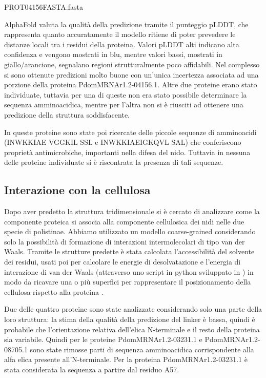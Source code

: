 \begin{texshade}{PROT04156FASTA.fasta}
  \shadeallresidues                    %
  \showlegend                          %
\end{texshade}


AlphaFold valuta la qualità della predizione tramite il punteggio pLDDT, che rappresenta quanto accuratamente il modello ritiene di poter prevedere le distanze locali tra i residui della proteina. 
Valori pLDDT alti indicano alta confidenza e vengono mostrati in blu, mentre valori bassi, mostrati in giallo/arancione, segnalano regioni strutturalmente poco affidabili.
Nel complesso si sono ottenute predizioni molto buone con un'unica incertezza associata ad una porzione della proteina PdomMRNAr1.2-04156.1.
Altre due proteine erano stato individuate, tuttavia per una di queste non era stato possibile determinare la sequenza amminoacidica, mentre per l'altra non si è riusciti ad ottenere una predizione della struttura soddisfacente.

In queste proteine sono state poi ricercate delle piccole sequenze di amminoacidi (INWKKIAE VGGKIL SSL e INWKKIAEIGKQVL SAL) che conferiscono proprietà antimicrobiche, importanti nella difesa del nido. \cite{Turillazzi2006Dominulin}
Tuttavia in nessuna delle proteine individuate si è riscontrata la presenza di tali sequenze.

\subsection{Interazione con la cellulosa}

Dopo aver predetto la struttura tridimensionale si è cercato di analizzare come la componente proteica si associa alla componente cellulosica dei nidi nelle due specie di polistinae. Abbiamo utilizzato un modello coarse-grained considerando solo la possibilità di formazione di interazioni intermolecolari di tipo van der Waals.
Tramite le strutture predette è stata calcolata l'accessibilità del solvente dei residui, usati poi per calcolare le energie di desolvatazione e l'energia di interazione di van der Waals (attraverso uno script in python sviluppato in \cite{CEROFOLINI2}) in modo da ricavare una o più superfici per rappresentare il posizionamento della cellulosa rispetto alla proteina \cite{CEROFOLINI2}.

Due delle quattro proteine sono state analizzate considerando solo una parte della loro struttura: la stima della qualità della predizione del linker è bassa, quindi è probabile che l'orientazione relativa dell'elica N-terminale e il resto della proteina sia variabile.
Quindi per le proteine PdomMRNAr1.2-03231.1 e PdomMRNAr1.2-08705.1 sono state rimosse parti di sequenza amminoacidica corrispondente alla alfa elica presente all'N-terminale.
Per la proteina PdomMRNAr1.2-03231.1 è stata considerata la sequenza a partire dal residuo A57.

